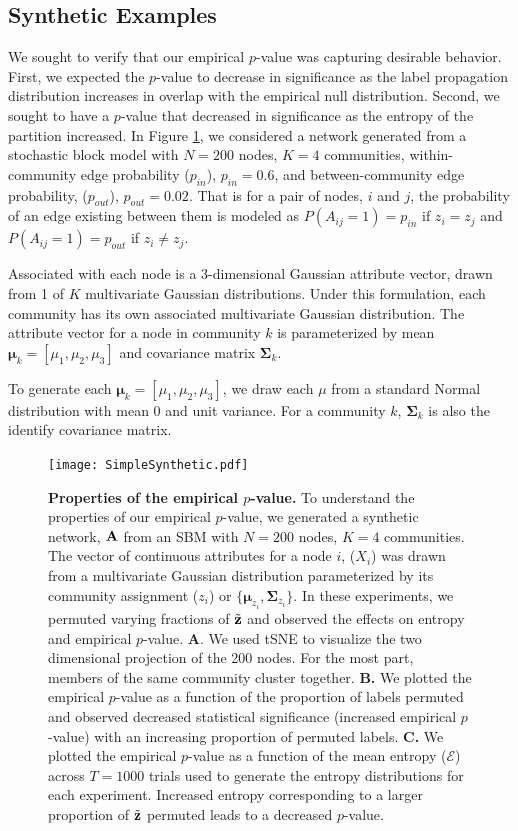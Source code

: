\subsection{Synthetic Examples}
We sought to verify that our empirical $p$-value was capturing desirable behavior. First, we expected the $p$-value to decrease in significance as the label propagation distribution increases in overlap with the empirical null distribution. Second, we sought to have a $p$-value that decreased in significance as the entropy of the partition increased. In Figure \ref{Align:Syn1}, we considered a network generated from a stochastic block model with $N=200$ nodes, $K=4$ communities, within-community edge probability ($p_{in}$), $p_{in}=0.6$, and between-community edge probability, ($p_{out}$), $p_{out}=0.02$. That is for a pair of nodes, $i$ and $j$, the probability of an edge existing between them is modeled as $P(A_{ij}=1)=p_{in}$ if $z_{i}=z_{j}$ and $P(A_{ij}=1)=p_{out}$ if $z_{i}\ne z_{j}$.

Associated with each node is a 3-dimensional Gaussian attribute vector, drawn from 1 of $K$ multivariate Gaussian distributions. Under this formulation, each community has its own associated multivariate Gaussian distribution. The attribute vector for a node in community $k$ is parameterized by mean ${\boldsymbol \mu}_{k}=[\mu_{1},\mu_{2},\mu_{3}]$ and covariance matrix ${\boldsymbol \Sigma}_{k}$.
 
 To generate each ${\boldsymbol \mu}_{k}=[\mu_{1},\mu_{2},\mu_{3}]$, we draw each $\mu$ from a standard Normal distribution with mean 0 and unit variance. For a community $k$, ${\boldsymbol \Sigma}_{k}$ is also the identify covariance matrix.

\begin{figure}
\centering
\begin{center}
\texttt{[image: SimpleSynthetic.pdf]}
\caption{{\bf Properties of the empirical $p$-value.} To understand the properties of our empirical $p$-value, we generated a synthetic network, ${\bf A}$ from an SBM with $N=200$ nodes, $K=4$ communities. The vector of continuous attributes for a node $i$, ($X_{i}$) was drawn from a multivariate Gaussian distribution parameterized by its community assignment ($z_{i}$) or $\{{\boldsymbol \mu}_{z_{i}}, {\boldsymbol \Sigma}_{z_{i}}\}$. In these experiments, we permuted varying fractions of $\tilde{{\bf z}}$ and observed the effects on entropy and empirical $p$-value. {\bf A}. We used tSNE to visualize the two dimensional projection of the 200 nodes. For the most part, members of the same community cluster together. {\bf B.} We plotted the empirical $p$-value as a function of the proportion of labels permuted and observed decreased statistical significance (increased empirical $p$-value) with an increasing proportion of permuted labels. {\bf C.} We plotted the empirical $p$-value as a function of the mean entropy ($\mathcal{E}$) across $T=1000$ trials used to generate the entropy distributions for each experiment. Increased entropy corresponding to a larger proportion of $\tilde{\bf z}$ permuted leads to a decreased $p$-value.}
\label{Align:Syn1}
\end{center}
\end{figure}

